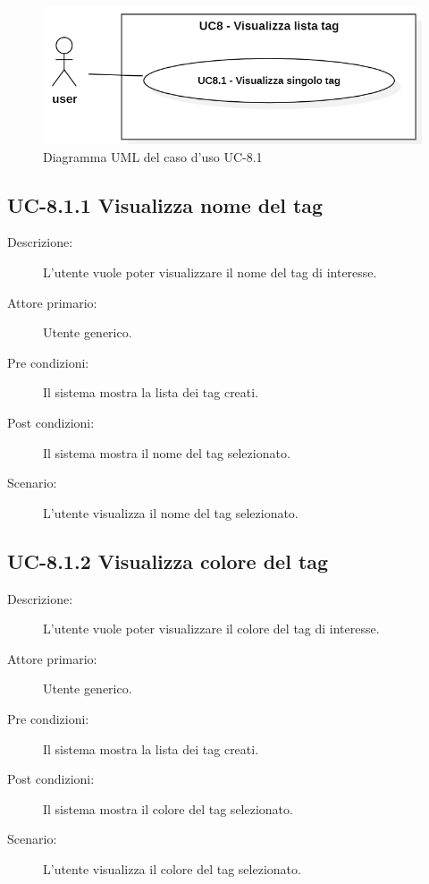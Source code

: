 \begin{figure}[H]
    \centering
    \includegraphics[width=0.8\linewidth]{UC8.1.PNG}
    \caption{Diagramma UML del caso d'uso UC-8.1}
    \label{fig:UC8.10}
\end{figure}
\subsection{UC-8.1.1 Visualizza nome del tag}
\begin{description}
    \item[Descrizione:] L’utente vuole poter visualizzare il nome del tag di interesse.
    \item[Attore primario:] Utente generico.
    \item[Pre condizioni:] Il sistema mostra la lista dei tag creati.
    \item[Post condizioni:] Il sistema mostra il nome del tag selezionato.
    \item[Scenario:] L'utente visualizza il nome del tag selezionato.
\end{description}

\subsection{UC-8.1.2 Visualizza colore del tag}
\begin{description}
    \item[Descrizione:] L’utente vuole poter visualizzare il colore del tag di interesse.
    \item[Attore primario:] Utente generico.
    \item[Pre condizioni:] Il sistema mostra la lista dei tag creati.
    \item[Post condizioni:] Il sistema mostra il colore del tag selezionato.
    \item[Scenario:] L'utente visualizza il colore del tag selezionato.
\end{description}

